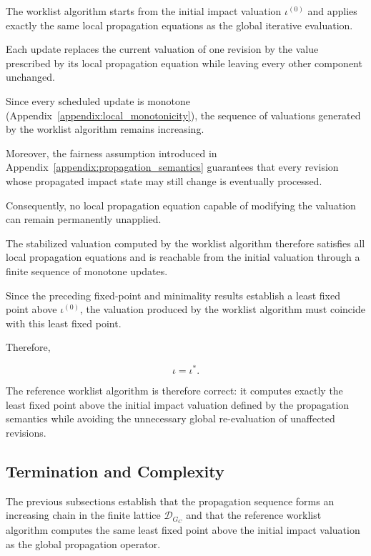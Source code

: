\documentclass[10pt]{article}
\begin{document}
The worklist algorithm starts from the initial impact valuation
$\iota^{(0)}$ and applies exactly the same local propagation equations as the global iterative evaluation.

Each update replaces the current valuation of one revision by the value prescribed by its local propagation equation while leaving every other component unchanged.

Since every scheduled update is monotone
(Appendix~\ref{appendix:local_monotonicity}), the sequence of valuations generated by the worklist algorithm remains increasing.

Moreover, the fairness assumption introduced in
Appendix~\ref{appendix:propagation_semantics} guarantees that every revision whose propagated impact state may still change
is eventually processed.

Consequently, no local propagation equation capable of modifying the valuation can remain permanently unapplied.

The stabilized valuation computed by the worklist algorithm therefore satisfies all local propagation equations and is reachable from the initial valuation through a finite sequence of monotone updates.

Since the preceding fixed-point and minimality results establish a least fixed
point above $\iota^{(0)}$, the valuation produced by the worklist algorithm must
coincide with this least fixed point.

Therefore,

\begin{equation}
	\label{eq:worklist_correctness}
	\iota
	=
	\iota^{*}.
\end{equation}

The reference worklist algorithm is therefore correct: it computes exactly the least fixed point above the initial impact valuation defined by the propagation semantics while avoiding the unnecessary global re-evaluation of unaffected revisions.

\subsection{Termination and Complexity}

The previous subsections establish that the propagation sequence forms an increasing chain in the finite lattice $\mathcal D_{G_C}$
and that the reference worklist algorithm computes the same least fixed point above the initial impact valuation as the global propagation operator.
\end{document}
